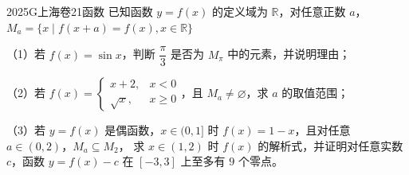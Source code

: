 
\begin{problem}{2025}{G}{上海卷}{21}{函数}
已知函数 $y=f(x)$ 的定义域为 $\mathbb{R}$，对任意正数 $a$，$M_a = \{x \mid f(x+a) = f(x), x \in \mathbb{R}\}$

（1）若 $f(x)=\sin x$，判断 $\dfrac{\pi}{3}$ 是否为 $M_\pi$ 中的元素，并说明理由；

（2）若 $f(x)=\begin{cases} x+2, & x < 0 \\ \sqrt{x}, & x \ge 0 \end{cases}$，且 $M_a \neq \varnothing$，求 $a$ 的取值范围；

（3）若 $y=f(x)$ 是偶函数，$x \in (0, 1]$ 时 $f(x)=1-x$，且对任意 $a \in (0, 2)$，$M_a \subseteq M_2$，
求 $x \in (1, 2)$ 时 $f(x)$ 的解析式，并证明对任意实数 $c$，函数 $y=f(x)-c$ 在 $[-3, 3]$ 上至多有 $9$ 个零点。
\end{problem}

\begin{answer}
\end{answer}

\begin{solutions}
\end{solutions}